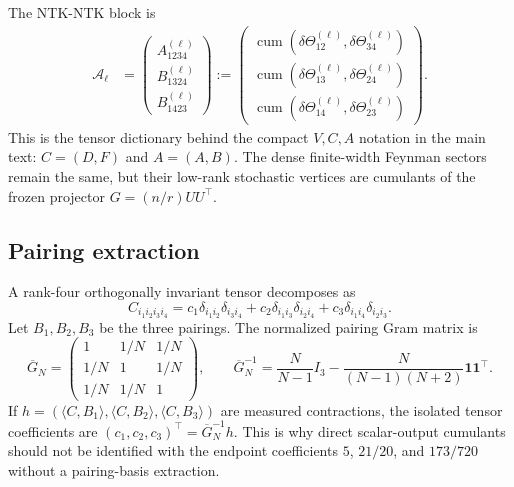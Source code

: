 \documentclass{article}
\newcommand{\cumul}{\operatorname{cum}}
\newcommand{\one}{\mathbf 1}
\begin{document}
The NTK-NTK block is
\begin{align}
\mathcal A_\ell
&=
\begin{pmatrix}
A_{1234}^{(\ell)}\\
B_{1324}^{(\ell)}\\
B_{1423}^{(\ell)}
\end{pmatrix}
:=
\begin{pmatrix}
\cumul(\delta\Theta_{12}^{(\ell)},\delta\Theta_{34}^{(\ell)})\\
\cumul(\delta\Theta_{13}^{(\ell)},\delta\Theta_{24}^{(\ell)})\\
\cumul(\delta\Theta_{14}^{(\ell)},\delta\Theta_{23}^{(\ell)})
\end{pmatrix}.
\label{eq:A-full-dictionary}
\end{align}
This is the tensor dictionary behind the compact \(V,C,A\) notation in the main text: \(C=(D,F)\) and \(A=(A,B)\). The dense finite-width Feynman sectors remain the same, but their low-rank stochastic vertices are cumulants of the frozen projector \(G=(n/r)UU^\top\).

\subsection{Pairing extraction}
A rank-four orthogonally invariant tensor decomposes as
\begin{equation}
C_{i_1i_2i_3i_4}
=c_1\delta_{i_1i_2}\delta_{i_3i_4}
+c_2\delta_{i_1i_3}\delta_{i_2i_4}
+c_3\delta_{i_1i_4}\delta_{i_2i_3}.
\label{eq:appendix-pairing}
\end{equation}
Let \(B_1,B_2,B_3\) be the three pairings. The normalized pairing Gram matrix is
\begin{equation}
\overline G_N
=
\begin{pmatrix}
1&1/N&1/N\\
1/N&1&1/N\\
1/N&1/N&1
\end{pmatrix},
\qquad
\overline G_N^{-1}
=\frac{N}{N-1}I_3-\frac{N}{(N-1)(N+2)}\one\one^\top.
\label{eq:appendix-pairing-inv}
\end{equation}
If \(h=(\langle C,B_1\rangle,\langle C,B_2\rangle,\langle C,B_3\rangle)\) are measured contractions, the isolated tensor coefficients are \((c_1,c_2,c_3)^\top=\overline G_N^{-1}h\). This is why direct scalar-output cumulants should not be identified with the endpoint coefficients \(5\), \(21/20\), and \(173/720\) without a pairing-basis extraction.
\end{document}
